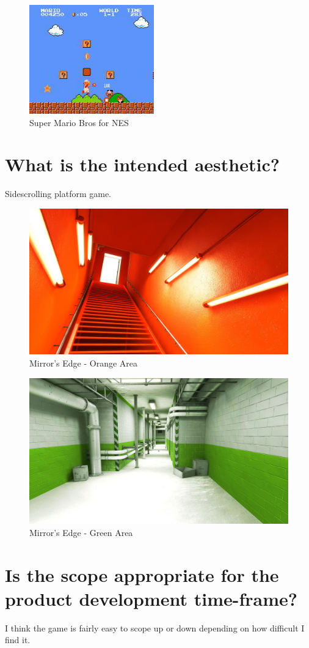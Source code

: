 \documentclass{scrartcl}
\begin{document}
\begin{figure}[H]
	\centering
	\includegraphics[width=0.48\textwidth]{mario.JPG}
	\caption{Super Mario Bros for NES }
\end{figure}


\section{What is the intended aesthetic?}
Sidescrolling platform game.


\begin{figure}[H]
	\centering
	\includegraphics[scale=0.15]{MEO.jpg}
	\caption{Mirror's Edge - Orange Area}
	
\end{figure}

\begin{figure}[H]
	\centering
	\includegraphics[scale=0.2]{MEG.jpg}
	\caption{Mirror's Edge - Green Area}
\end{figure}

\section{Is the scope appropriate for the product development time-frame?}
I think the game is fairly easy to scope up or down depending on how difficult I find it. 
	
\end{document}

